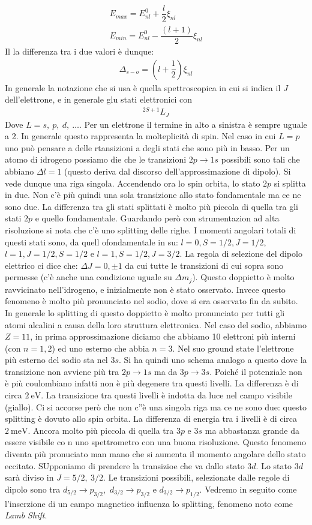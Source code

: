 \documentclass[../AppuntiStruttura]{subfiles}
\begin{document}
	\begin{gather*}
	E_{max}=E^{0}_{nl}+\dfrac{l}{2}\xi_{nl} \\
	E_{min}=E^{0}_{nl}-\dfrac{(l+1)}{2}\xi_{nl}
	\end{gather*}
	Il la differenza tra i due valori è dunque:
	\begin{gather*}
		\Delta_{s-o}=\left(l+\dfrac{1}{2}\right)\xi_{nl}
	\end{gather*}
	In generale la notazione che si usa è quella spettroscopica in cui si indica il $ J $ dell'elettrone, e in generale glu stati elettronici con
	\begin{gather*}
	 ^{2S+1}L_{J}
	\end{gather*}
	Dove $ L=s,\ p,\ d,\ \dots $. Per un elettrone il termine in alto a sinistra è sempre uguale a 2. In generale questo rappresenta la molteplicità di spin. Nel caso in cui  $ L=p $ uno può pensare a delle rtansizioni a degli stati che sono più in basso. Per un atomo di idrogeno possiamo die che le transizioni $ 2p\to 1s $ possibili sono tali che abbiano $ \Delta l = 1 $ (questo deriva dal discorso dell'approssimazione di dipolo). Si vede dunque una riga singola. Accendendo ora lo spin orbita, lo stato $ 2p $ si splitta in due. Non c'è più quindi una sola transizione allo stato fondamentale ma ce ne sono due. La differenza tra gli stati splittati è molto più piccola di quella tra gli stati $ 2p $ e quello fondamentale. Guardando però con strumentazion ad alta risoluzione si nota che c'è uno splitting delle righe. I momenti angolari totali di questi stati sono, da quell ofondamentale in su: $ l=0, S=1/2, J=1/2 $, $ l=1, J=1/2, S=1/2 $ e $ l=1, S=1/2, J=3/2 $. La regola di selezione del dipolo elettrico ci dice che: $ \Delta J = 0, \pm 1 $ da cui tutte le transizioni di cui sopra sono permesse (c'è anche una condizione uguale su $ \Delta m_{j} $). Questo doppietto è molto ravvicinato nell'idrogeno, e inizialmente non è stato osservato. Invece questo fenomeno è molto più pronunciato nel sodio, dove si era osservato fin da subito. In generale lo splitting di questo doppietto è molto pronunciato per tutti gli atomi alcalini a causa della loro struttura elettronica. Nel caso del sodio, abbiamo $ Z=11 $, in prima approssimazione diciamo che abbiamo 10 elettroni più interni (con $ n=1,2 $) ed uno esterno che abbia $ n=3 $. Nel suo ground state l'elettrone più esterno del sodio sta nel $ 3s $. Si ha quindi uno schema analogo a questo dove la transizione non avviene più tra $ 2p\to 1s $ ma da $ 3p\to3s $. Poiché il potenziale non è più coulombiano infatti non è più degenere tra questi livelli. La differenza è di circa $ \SI{2}{\electronvolt} $. La transizione tra questi livelli è indotta da luce nel campo visibile (giallo). Ci si accorse però che non c''è una singola riga ma ce ne sono due: questo splitting è dovuto allo spin orbita. La differenza di energia tra i livelli è di circa $ \SI{2}{\milli\electronvolt} $. Ancora molto più piccola di quella tra $ 3p $ e $ 3s $ ma abbastanza grande da essere visibile co n uno spettrometro con una buona risoluzione. Questo fenomeno diventa più pronuciato man mano che si aumenta il momento angolare dello stato eccitato. SUpponiamo di prendere la transizioe che va dallo stato $ 3d  $. Lo stato $ 3d $ sarà diviso in $ J=5/2,\ 3/2 $. Le transizioni possibili, selezionate dalle regole di dipolo sono tra $ d_{5/2}\to p_{3/2} $,\ $ d_{3/2}\to p_{3/2} $ e $ d_{3/2}\to p_{1/2} $. Vedremo in seguito come l'inserzione di un campo magnetico influenza lo splitting, fenomeno noto come \emph{Lamb Shift}.
\end{document}
